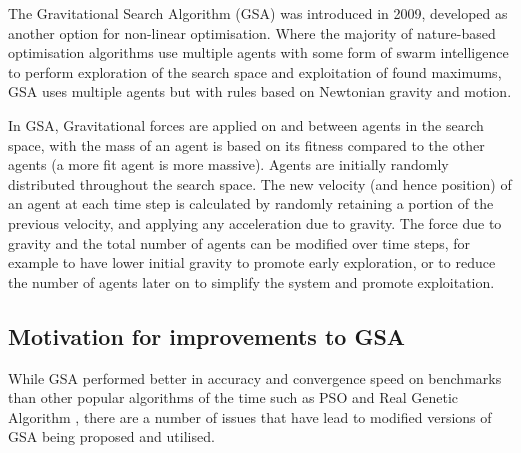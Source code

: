 The Gravitational Search Algorithm (GSA) \cite{GSA} was introduced in 2009, developed as another option for non-linear optimisation.
Where the majority of nature-based optimisation algorithms use multiple agents with some form of swarm intelligence to perform exploration of the search space and exploitation of found maximums, GSA uses multiple agents but with rules based on Newtonian gravity and motion.

In GSA, Gravitational forces are applied on and between agents in the search space, with the mass of an agent is based on its fitness compared to the other agents (a more fit agent is more massive).
Agents are initially randomly distributed throughout the search space.
The new velocity (and hence position) of an agent at each time step is calculated by randomly retaining a portion of the previous velocity, and applying any acceleration due to gravity.
The force due to gravity and the total number of agents can be modified over time steps, for example to have lower initial gravity to promote early exploration, or to reduce the number of agents later on to simplify the system and promote exploitation.


\subsection{Motivation for improvements to GSA}\label{sec:alg:gsa:motiviation}
While GSA performed better in accuracy and convergence speed on benchmarks than other popular algorithms of the time such as PSO and Real Genetic Algorithm \cite{GSA}, there are a number of issues that have lead to modified versions of GSA being proposed and utilised.

